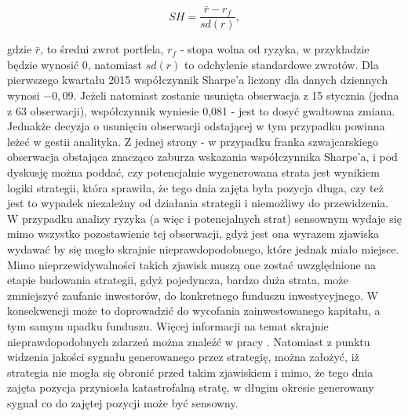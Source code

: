 \documentclass[a4paper,12pt,openany, DIV=calc, headsepline]{scrbook}
\begin{document}
\begin{equation}
\label{eq:sharpe}
SH = \frac{\bar{r} - r_f}{sd(r)},
\end{equation}

gdzie $\bar{r}$, to średni zwrot portfela, $r_f$ - stopa wolna od ryzyka, w przykładzie będzie wynosić $0$, natomiast $sd(r)$ to odchylenie standardowe zwrotów. Dla pierwszego kwartału 2015 współczynnik Sharpe'a liczony dla danych dziennych wynosi $-0,09$. Jeżeli natomiast zostanie usunięta obserwacja z 15 stycznia (jedna z 63 obserwacji), współczynnik wyniesie 0,081 - jest to dosyć gwałtowna zmiana. Jednakże decyzja o usunięciu obserwacji odstającej w tym przypadku powinna leżeć w gestii analityka. Z jednej strony - w przypadku franka szwajcarskiego obserwacja obstająca znacząco zaburza wskazania współczynnika Sharpe'a, i pod dyskusję można poddać, czy potencjalnie wygenerowana strata jest wynikiem logiki strategii, która sprawiła, że tego dnia zajęta była pozycja długa, czy też jest to wypadek niezależny od działania strategii i niemożliwy do przewidzenia. W przypadku analizy ryzyka (a więc i potencjalnych strat) sensownym wydaje się mimo wszystko pozostawienie tej obserwacji, gdyż jest ona wyrazem zjawiska wydawać by się mogło skrajnie  nieprawdopodobnego, które jednak miało miejsce. Mimo nieprzewidywalności takich zjawisk muszą one zostać uwzględnione na etapie budowania strategii, gdyż pojedyncza, bardzo duża strata, może zmniejszyć zaufanie inwestorów, do konkretnego funduszu inwestycyjnego. W konsekwencji może to doprowadzić do wycofania zainwestowanego kapitału, a tym samym upadku funduszu. Więcej informacji na temat skrajnie nieprawdopodobnych zdarzeń można znaleźć w pracy \citep{Taleb2007}. Natomiast z punktu widzenia jakości sygnału generowanego przez strategię, można założyć, iż strategia nie mogła się obronić przed takim zjawiskiem i mimo, że tego dnia zajęta pozycja przyniosła katastrofalną stratę, w długim okresie generowany sygnał co do zajętej pozycji może być sensowny.
\end{document}
